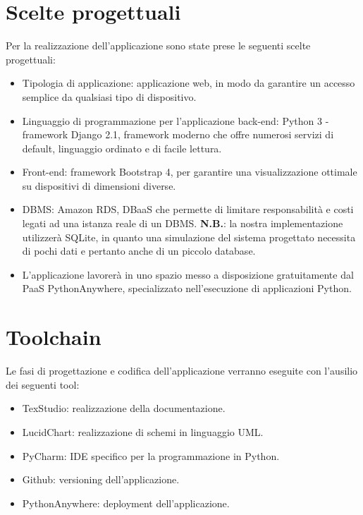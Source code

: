 \documentclass[10pt,a4paper]{report}
\begin{document}
	\section{Scelte progettuali}
	Per la realizzazione dell'applicazione sono state prese le seguenti scelte progettuali:
	\begin{itemize}
		\item Tipologia di applicazione: applicazione web, in modo da garantire un accesso semplice da qualsiasi tipo di dispositivo.
		\item Linguaggio di programmazione per l'applicazione back-end: Python 3 - framework Django 2.1, framework moderno che offre numerosi servizi di default, linguaggio ordinato e di facile lettura.
		\item Front-end: framework Bootstrap 4, per garantire una visualizzazione ottimale su dispositivi di dimensioni diverse.
		\item DBMS: Amazon RDS, DBaaS che permette di limitare responsabilità e costi legati ad una istanza reale di un DBMS. \textbf{N.B.}: la nostra implementazione utilizzerà SQLite, in quanto una simulazione del sistema progettato necessita di pochi dati e pertanto anche di un piccolo database.
		\item L'applicazione lavorerà in uno spazio messo a disposizione gratuitamente dal PaaS PythonAnywhere, specializzato nell'esecuzione di applicazioni Python.
	\end{itemize}

	\section{Toolchain}
	Le fasi di progettazione e codifica dell'applicazione verranno eseguite con l'ausilio dei seguenti tool:
	\begin{itemize}
		\item TexStudio: realizzazione della documentazione.
		\item LucidChart: realizzazione di schemi in linguaggio UML.
		\item PyCharm: IDE specifico per la programmazione in Python.
		\item Github: versioning dell'applicazione.
		\item PythonAnywhere: deployment dell'applicazione.
	\end{itemize}
	
\end{document}
